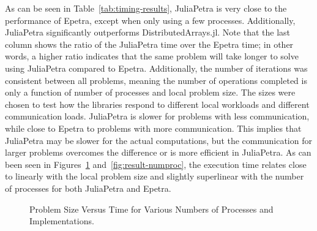 \documentclass[acmsmall]{acmart}
\begin{document}
	As can be seen in Table~\ref{tab:timing-results}, JuliaPetra is very close to the performance of Epetra, except when only using a few processes.
	Additionally, JuliaPetra significantly outperforms DistributedArrays.jl.
	Note that the last column shows the ratio of the JuliaPetra time over the Epetra time; in other words, a higher ratio indicates that the same problem will take longer to solve using JuliaPetra compared to Epetra.
	Additionally, the number of iterations was consistent between all problems, meaning the number of operations completed is only a function of number of processes and local problem size.
	The sizes were chosen to test how the libraries respond to different local workloads and different communication loads.
	JuliaPetra is slower for problems with less communication, while close to Epetra to problems with more communication.
	This implies that JuliaPetra may be slower for the actual computations, but the communication for larger problems overcomes the difference or is more efficient in JuliaPetra.
	As can been seen in Figures~\ref{fig:result-localsize} and~\ref{fig:result-numproc}, the execution time relates close to linearly with the local problem size and slightly superlinear with the number of processes for both JuliaPetra and Epetra.
	
	\begin{figure}
		\caption{Problem Size Versus Time for Various Numbers of Processes and Implementations.}
		\label{fig:result-localsize}
	\end{figure}
	
\end{document}
